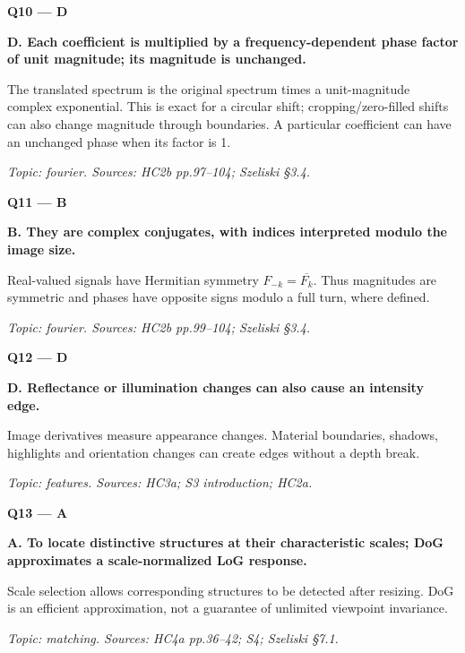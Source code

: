 \documentclass[11pt,a4paper]{article}
\begin{document}
\par\vspace{12pt}
\begin{minipage}{\linewidth}
\textbf{Q10 — D}\par\smallskip
\textbf{D. Each coefficient is multiplied by a frequency-dependent phase factor of unit magnitude; its magnitude is unchanged.}\par
The translated spectrum is the original spectrum times a unit-magnitude complex exponential. This is exact for a circular shift; cropping/\allowbreak{}zero-filled shifts can also change magnitude through boundaries. A particular coefficient can have an unchanged phase when its factor is 1.\par
{\small\itshape Topic: fourier. Sources: HC2b pp.97–104; Szeliski §3.4.}

\end{minipage}
\par\vspace{12pt}
\begin{minipage}{\linewidth}
\textbf{Q11 — B}\par\smallskip
\textbf{B. They are complex conjugates,\allowbreak{} with indices interpreted modulo the image size.}\par
Real-valued signals have Hermitian symmetry \(F_{-k}=\overline{F_k}\). Thus magnitudes are symmetric and phases have opposite signs modulo a full turn,\allowbreak{} where defined.\par
{\small\itshape Topic: fourier. Sources: HC2b pp.99–104; Szeliski §3.4.}

\end{minipage}
\par\vspace{12pt}
\begin{minipage}{\linewidth}
\textbf{Q12 — D}\par\smallskip
\textbf{D. Reflectance or illumination changes can also cause an intensity edge.}\par
Image derivatives measure appearance changes. Material boundaries,\allowbreak{} shadows,\allowbreak{} highlights and orientation changes can create edges without a depth break.\par
{\small\itshape Topic: features. Sources: HC3a; S3 introduction; HC2a.}

\end{minipage}
\par\vspace{12pt}
\begin{minipage}{\linewidth}
\textbf{Q13 — A}\par\smallskip
\textbf{A. To locate distinctive structures at their characteristic scales; DoG approximates a scale-normalized LoG response.}\par
Scale selection allows corresponding structures to be detected after resizing. DoG is an efficient approximation,\allowbreak{} not a guarantee of unlimited viewpoint invariance.\par
{\small\itshape Topic: matching. Sources: HC4a pp.36–42; S4; Szeliski §7.1.}

\end{minipage}
\end{document}
